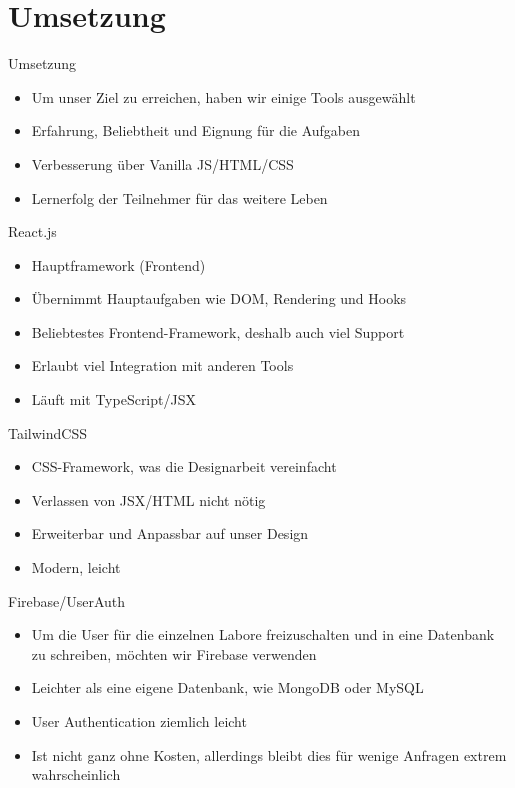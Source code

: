 \documentclass[usenames,dvipsnames,10pt]{beamer}
\begin{document}
    \section{Umsetzung}
    \begin{frame}{Umsetzung}
      \begin{itemize}
        \item Um unser Ziel zu erreichen, haben wir einige Tools ausgewählt
        \item Erfahrung, Beliebtheit und Eignung für die Aufgaben
        \item Verbesserung über Vanilla JS/HTML/CSS
        \item Lernerfolg der Teilnehmer für das weitere Leben
      \end{itemize}
    \end{frame}
    \begin{frame}{React.js}
        \begin{itemize}
            \item Hauptframework (Frontend)
            \item Übernimmt Hauptaufgaben wie DOM, Rendering und Hooks
            \item Beliebtestes Frontend-Framework, deshalb auch viel Support
            \item Erlaubt viel Integration mit anderen Tools
            \item Läuft mit TypeScript/JSX
        \end{itemize}
    \end{frame}
    \begin{frame}{TailwindCSS}
        \begin{itemize}
            \item CSS-Framework, was die Designarbeit vereinfacht
            \item Verlassen von JSX/HTML nicht nötig
            \item Erweiterbar und Anpassbar auf unser Design
            \item Modern, leicht
        \end{itemize}
    \end{frame}
    \begin{frame}{Firebase/UserAuth}
            \begin{itemize}
                \item Um die User für die einzelnen Labore freizuschalten und in eine Datenbank zu schreiben, möchten wir Firebase verwenden
                \item Leichter als eine eigene Datenbank, wie MongoDB oder MySQL
                \item User Authentication ziemlich leicht
                \item Ist nicht ganz ohne Kosten, allerdings bleibt dies für wenige Anfragen extrem wahrscheinlich
            \end{itemize}
    \end{frame}
\end{document}
